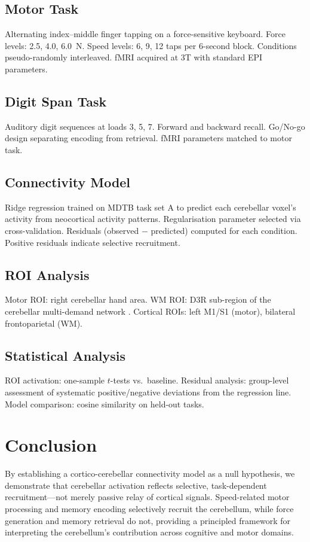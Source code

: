 \documentclass[11pt]{article}
\begin{document}
\subsection{Motor Task}
Alternating index--middle finger tapping on a force-sensitive keyboard. Force levels: 2.5, 4.0, 6.0~N. Speed levels: 6, 9, 12 taps per 6-second block. Conditions pseudo-randomly interleaved. fMRI acquired at 3T with standard EPI parameters.

\subsection{Digit Span Task}
Auditory digit sequences at loads 3, 5, 7. Forward and backward recall. Go/No-go design separating encoding from retrieval. fMRI parameters matched to motor task.

\subsection{Connectivity Model}
Ridge regression \citep{hoerl1970ridge} trained on MDTB task set A to predict each cerebellar voxel's activity from neocortical activity patterns. Regularisation parameter selected via cross-validation. Residuals (observed $-$ predicted) computed for each condition. Positive residuals indicate selective recruitment.

\subsection{ROI Analysis}
Motor ROI: right cerebellar hand area. WM ROI: D3R sub-region of the cerebellar multi-demand network \citep{king2019functional}. Cortical ROIs: left M1/S1 (motor), bilateral frontoparietal (WM).

\subsection{Statistical Analysis}
ROI activation: one-sample $t$-tests vs.\ baseline. Residual analysis: group-level assessment of systematic positive/negative deviations from the regression line. Model comparison: cosine similarity on held-out tasks.

\section{Conclusion}

By establishing a cortico-cerebellar connectivity model as a null hypothesis, we demonstrate that cerebellar activation reflects selective, task-dependent recruitment---not merely passive relay of cortical signals. Speed-related motor processing and memory encoding selectively recruit the cerebellum, while force generation and memory retrieval do not, providing a principled framework for interpreting the cerebellum's contribution across cognitive and motor domains.



\end{document}
